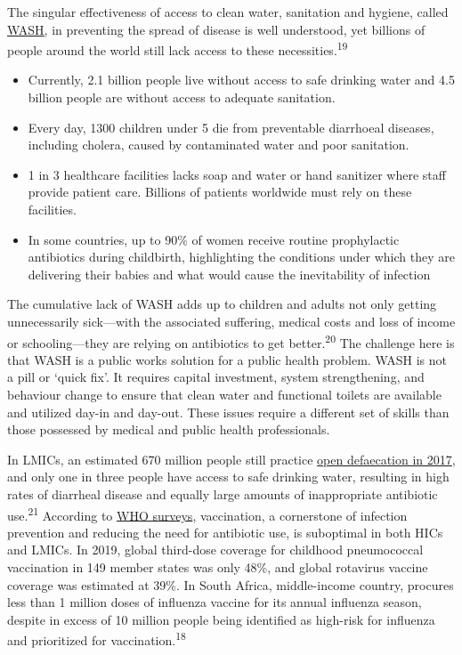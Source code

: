 \documentclass[
]{book}
\providecommand{\tightlist}{%
  \setlength{\itemsep}{0pt}\setlength{\parskip}{0pt}}
\begin{document}
The singular effectiveness of access to clean water, sanitation and hygiene, called \href{https://www.who.int/health-topics/water-sanitation-and-hygiene-wash}{WASH,} in preventing the spread of disease is well understood, yet billions of people around the world still lack access to these necessities.\textsuperscript{19}

\begin{itemize}
\tightlist
\item
  Currently, 2.1 billion people live without access to safe drinking water and 4.5 billion people are without access to adequate sanitation.
\item
  Every day, 1300 children under 5 die from preventable diarrhoeal diseases, including cholera, caused by contaminated water and poor sanitation.
\item
  1 in 3 healthcare facilities lacks soap and water or hand sanitizer where staff provide patient care. Billions of patients worldwide must rely on these facilities.
\item
  In some countries, up to 90\% of women receive routine prophylactic antibiotics during childbirth, highlighting the conditions under which they are delivering their babies and what would cause the inevitability of infection
\end{itemize}

The cumulative lack of WASH adds up to children and adults not only getting unnecessarily sick---with the associated suffering, medical costs and loss of income or schooling---they are relying on antibiotics to get better.\textsuperscript{20} The challenge here is that WASH is a public works solution for a public health problem. WASH is not a pill or `quick fix'. It requires capital investment, system strengthening, and behaviour change to ensure that clean water and functional toilets are available and utilized day-in and day-out. These issues require a different set of skills than those possessed by medical and public health professionals.

In LMICs, an estimated 670 million people still practice \href{https://blogs.worldbank.org/opendata/open-defeca\%20tion-nearly-halved-2000-still-practiced-670-million}{open defaecation in 2017}, and only one in three people have access to safe drinking water, resulting in high rates of diarrheal disease and equally large amounts of inappropriate antibiotic use.\textsuperscript{21} According to \href{https://www.who.int/news-room/\%20fact-sheets/detail/immunization-coverage.}{WHO surveys}, vaccination, a cornerstone of infection prevention and reducing the need for antibiotic use, is suboptimal in both HICs and LMICs. In 2019, global third-dose coverage for childhood pneumococcal vaccination in 149 member states was only 48\%, and global rotavirus vaccine coverage was estimated at 39\%. In South Africa, middle-income country, procures less than 1 million doses of influenza vaccine for its annual influenza season, despite in excess of 10 million people being identified as high-risk for influenza and prioritized for vaccination.\textsuperscript{18}
\end{document}
